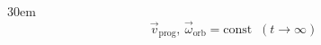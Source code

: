 \documentclass[border=4pt]{standalone}
\begin{document}
\begin{varwidth}{30em}
\large
\[ \vec{v}_{\text{prog}},\, \vec{\omega}_{\text{orb}} = \text{const} \;\; (t \to \infty) \]

\end{varwidth}
\end{document}
